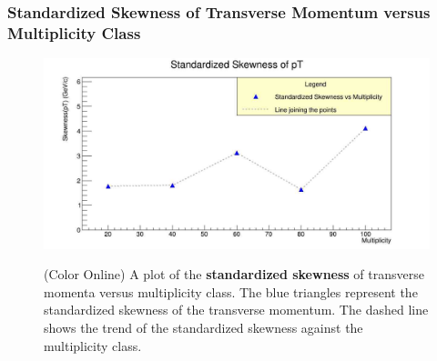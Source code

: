 \documentclass[letterpaper,aps,prc,superscriptaddress,nofootinbib,10pt,showpacs,floatfix]{revtex4-2}%
\begin{document}
\FloatBarrier
\vspace{-3mm}

\subsubsection{Standardized Skewness of Transverse Momentum versus Multiplicity Class}
\label{subsubsec:stdskew}
\vspace{-5mm}
\begin{figure}[!htb]
\begin{minipage}{0.9\textwidth}
   \label{Fig:8}
     \centering
     \renewcommand{\thefigure}{8}
     \includegraphics[width=0.9\linewidth]{stdskew}
     \caption{(Color Online) A plot of the \textbf{standardized skewness} of transverse momenta versus multiplicity class. The blue triangles represent the standardized skewness of the transverse momentum. The dashed line shows the trend of the standardized skewness against the multiplicity class.}
\end{minipage}
\end{figure}

\FloatBarrier
\vspace{-1mm}
\pagebreak
\end{document}
